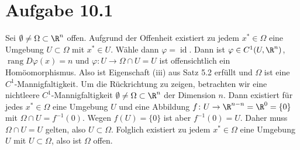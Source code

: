 \documentclass{article}
\begin{document}
\def\headheight{25pt}
    \section*{Aufgabe 10.1}
    Sei $\emptyset \neq \Omega \subset \R^n$ offen. 
    Aufgrund der Offenheit existiert zu jedem $x^* \in \Omega$ eine Umgebung $U \subset \Omega$ mit $x^* \in U$.
    Wähle dann $\varphi = \operatorname{id}$. 
    Dann ist $\varphi \in C^1(U, \R^n)$, $\operatorname{rang} D\varphi(x) = n$ und $\varphi\colon U \to \Omega \cap U = U$ 
    ist offensichtlich ein Homöomorphismus.
    Also ist Eigenschaft (iii) aus Satz 5.2 erfüllt und $\Omega$ ist eine $C^1$-Mannigfaltigkeit.
    Um die Rückrichtung zu zeigen, betrachten wir eine nichtleere $C^1$-Mannigfaltigkeit $\emptyset \neq \Omega \subset \R^n$ der Dimension $n$.
    Dann existiert für jedes $x^* \in \Omega$ eine Umgebung $U$ und eine Abbildung $f \colon U \to \R^{n-n} = \R^0 = \{0\}$ mit 
    $\Omega \cap U = f^{-1}(0)$. Wegen $f(U) = \{0\}$ ist aber $f^{-1}(0) = U$. 
    Daher muss $\Omega \cap U = U$ gelten, also $U \subset \Omega$. 
    Folglich existiert zu jedem $x^* \in \Omega$ eine Umgebung $U$ mit $U \subset \Omega$, also ist $\Omega$ offen.
\end{document}
